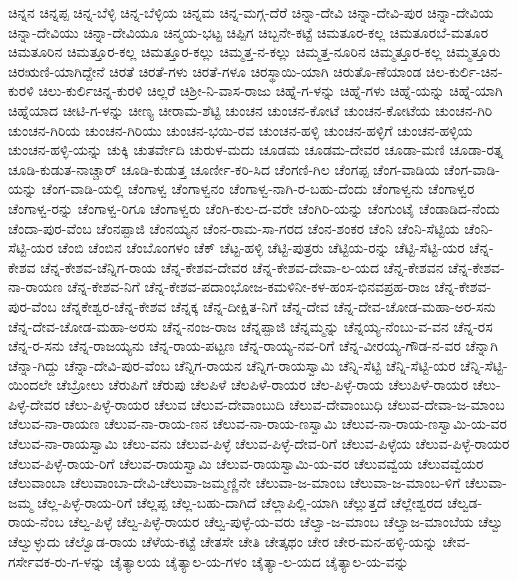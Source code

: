 ಚಿನ್ನನ
ಚಿನ್ನಪ್ಪ
ಚಿನ್ನ-ಬೆಳ್ಳಿ
ಚಿನ್ನ-ಬೆಳ್ಳಿಯ
ಚಿನ್ನಮ
ಚಿನ್ನ-ಮಗ್ಗ-ದೆರೆ
ಚಿನ್ನಾ-ದೇವಿ
ಚಿನ್ನಾ-ದೇವಿ-ಪುರ
ಚಿನ್ನಾ-ದೇವಿಯ
ಚಿನ್ನಾ-ದೇವಿಯು
ಚಿನ್ನಾ-ದೇವಿಯೂ
ಚಿನ್ಮಯ-ಭಟ್ಟ
ಚಿಪ್ಪಿಗ
ಚಿಬ್ಬನೇ-ಕಟ್ಟೆ
ಚಿಮತೂರ-ಕಲ್ಲ
ಚಿಮತೂರಬೆ-ಮತೂರ
ಚಿಮತೂರಿನ
ಚಿಮತ್ತೂರ-ಕಲ್ಲ
ಚಿಮತ್ತೂರ-ಕಲ್ಲು
ಚಿಮ್ಮತ್ತ-ನ-ಕಲ್ಲು
ಚಿಮ್ಮತ್ತ-ನೂರಿನ
ಚಿಮ್ಮತ್ತೂರ-ಕಲ್ಲ
ಚಿಮ್ಮತ್ತೂರು
ಚಿರಋಣಿ-ಯಾಗಿದ್ದೇನೆ
ಚಿರತೆ
ಚಿರತೆ-ಗಳು
ಚಿರತೆ-ಗಳೂ
ಚಿರಸ್ಥಾಯಿ-ಯಾಗಿ
ಚಿರುತೊ-ಣೆಯಾಂಡ
ಚಿಲ-ಕುರ್ಲಿ-ಚಿನ-ಕುರಳಿ
ಚಿಲು-ಕುರ್ಲಿಚಿನ್ನ-ಕುರಳಿ
ಚಿಲ್ಲರೆ
ಚಿಶ್ರೀ-ನಿ-ವಾಸ-ರಾಜು
ಚಿಹ್ನೆ-ಗ-ಳನ್ನು
ಚಿಹ್ನೆ-ಗಳು
ಚಿಹ್ನೆ-ಯನ್ನು
ಚಿಹ್ನೆ-ಯಾಗಿ
ಚಿಹ್ನೆಯಾದ
ಚೀಟಿ-ಗ-ಳನ್ನು
ಚೀಣ್ಯ
ಚೀರಾಮ-ಶೆಟ್ಟಿ
ಚುಂಚನ
ಚುಂಚನ-ಕೋಟೆ
ಚುಂಚನ-ಕೋಟೆಯ
ಚುಂಚನ-ಗಿರಿ
ಚುಂಚನ-ಗಿರಿಯ
ಚುಂಚನ-ಗಿರಿಯು
ಚುಂಚನ-ಭಯಿ-ರವ
ಚುಂಚನ-ಹಳ್ಳಿ
ಚುಂಚನ-ಹಳ್ಳಿಗೆ
ಚುಂಚನ-ಹಳ್ಳಿಯ
ಚುಂಚನ-ಹಳ್ಳಿ-ಯನ್ನು
ಚುಕ್ಕಿ
ಚುತರ್ವೇದಿ
ಚುರುಳ-ಮದು
ಚೂಡಮ
ಚೂಡಮ-ದೇವರ
ಚೂಡಾ-ಮಣಿ
ಚೂಡಾ-ರತ್ನ
ಚೂಡಿ-ಕುಡುತ-ನಾಚ್ಚಾರ್
ಚೂಡಿ-ಕುಡುತ್ತ
ಚೂರ್ಣೀ-ಕರಿ-ಸಿದ
ಚೆಂಗಣಿ-ಗಿಲ
ಚೆಂಗಪ್ಪ
ಚೆಂಗ-ವಾಡಿಯ
ಚೆಂಗ-ವಾಡಿ-ಯನ್ನು
ಚೆಂಗ-ವಾಡಿ-ಯಲ್ಲಿ
ಚೆಂಗಾಳ್ವ
ಚೆಂಗಾಳ್ವನಂ
ಚೆಂಗಾಳ್ವ-ನಾಗಿ-ರ-ಬಹು-ದೆಂದು
ಚೆಂಗಾಳ್ವನು
ಚೆಂಗಾಳ್ವರ
ಚೆಂಗಾಳ್ವ-ರನ್ನು
ಚೆಂಗಾಳ್ವ-ರಿಗೂ
ಚೆಂಗಾಳ್ವರು
ಚೆಂಗಿ-ಕುಲ-ದ-ವರೇ
ಚೆಂಗಿರಿ-ಯನ್ನು
ಚೆಂಗುಂಟೈ
ಚೆಂಡಾಡಿದ-ನೆಂದು
ಚೆಂದಾ-ಪುರ-ವೆಂಬ
ಚೆಂನಪ್ಪಾಜಿ
ಚೆಂನಯ್ಯನ
ಚೆಂನ-ರಾಮ-ಸಾ-ಗರದ
ಚೆಂನ-ಶಂಕರ
ಚೆಂನಿ
ಚೆಂನಿ-ಸೆಟ್ಟಿಯ
ಚೆಂನಿ-ಸೆಟ್ಟಿ-ಯರ
ಚೆಂಬಿ
ಚೆಂಬಿನ
ಚೆಂಬೊಂಗಳಂ
ಚೆಕ್
ಚೆಟ್ಟ-ಹಳ್ಳಿ
ಚೆಟ್ಟಿ-ಪುತ್ರರು
ಚೆಟ್ಟಿಯ-ರನ್ನು
ಚೆಟ್ಟಿ-ಸೆಟ್ಟಿ-ಯರ
ಚೆನ್ನ-ಕೇಶವ
ಚೆನ್ನ-ಕೇಶವ-ಚೆನ್ನಿಗ-ರಾಯ
ಚೆನ್ನ-ಕೇಶವ-ದೇವರ
ಚೆನ್ನ-ಕೇಶವ-ದೇವಾ-ಲ-ಯದ
ಚೆನ್ನ-ಕೇಶವನ
ಚೆನ್ನ-ಕೇಶವ-ನಾ-ರಾಯಣ
ಚೆನ್ನ-ಕೇಶವ-ನಿಗೆ
ಚೆನ್ನ-ಕೇಶವ-ಪದಾಂಭೋಜ-ಕಮಳಿನೀ-ಕಳ-ಹಂಸ-ಭಿನವಪ್ರಹ-ರಾಜ
ಚೆನ್ನ-ಕೇಶವ-ಪುರ-ವೆಂಬ
ಚೆನ್ನಕೇಶ್ವರ-ಚೆನ್ನ-ಕೇಶವ
ಚೆನ್ನಕ್ಕ
ಚೆನ್ನ-ದೀಕ್ಷಿತ-ನಿಗೆ
ಚೆನ್ನ-ದೇವ
ಚೆನ್ನ-ದೇವ-ಚೋಡ-ಮಹಾ-ಅರ-ಸನು
ಚೆನ್ನ-ದೇವ-ಚೋಡ-ಮಹಾ-ಅರಸು
ಚೆನ್ನ-ನಂಜ-ರಾಜ
ಚೆನ್ನಪ್ಪಾಜಿ
ಚೆನ್ನಮ್ಮನ್ನು
ಚೆನ್ನಯ್ಯ-ನೆಂಬು-ವ-ವನ
ಚೆನ್ನ-ರಸ
ಚೆನ್ನ-ರ-ಸನು
ಚೆನ್ನ-ರಾಜಯ್ಯನು
ಚೆನ್ನ-ರಾಯ-ಪಟ್ಟಣ
ಚೆನ್ನ-ರಾಯ್ಯ-ನವ-ರಿಗೆ
ಚೆನ್ನ-ವೀರಯ್ಯ-ಗೌಡ-ನ-ವರ
ಚೆನ್ನಾಗಿ
ಚೆನ್ನಾ-ಗಿದ್ದು
ಚೆನ್ನಾ-ದೇವಿ-ಪುರ-ವೆಂಬ
ಚೆನ್ನಿಗ-ರಾಯನ
ಚೆನ್ನಿಗ-ರಾಯಸ್ವಾಮಿ
ಚೆನ್ನಿ-ಸೆಟ್ಟಿ
ಚೆನ್ನಿ-ಸೆಟ್ಟಿ-ಯರ
ಚೆನ್ನಿ-ಸೆಟ್ಟಿ-ಯಿಂದಲೇ
ಚೆಬ್ರೋಲು
ಚೆರುಪಿಗೆ
ಚೆರುಪು
ಚೆಲಪಿಳೆ
ಚೆಲಪಿಳೆ-ರಾಯರ
ಚೆಲ-ಪಿಳ್ಳೆ-ರಾಯ
ಚೆಲುಪಿಳೆ-ರಾಯರ
ಚೆಲು-ಪಿಳ್ಳೆ-ದೇವರ
ಚೆಲು-ಪಿಳ್ಳೆ-ರಾಯರ
ಚೆಲುವ
ಚೆಲುವ-ದೇವಾಂಬುದಿ
ಚೆಲುವ-ದೇವಾಂಬುಧಿ
ಚೆಲುವ-ದೇವಾ-ಜ-ಮಾಂಬ
ಚೆಲುವ-ನಾ-ರಾಯಣ
ಚೆಲುವ-ನಾ-ರಾಯ-ಣನ
ಚೆಲುವ-ನಾ-ರಾಯ-ಣಸ್ವಾಮಿ
ಚೆಲುವ-ನಾ-ರಾಯ-ಣಸ್ವಾಮಿ-ಯ-ವರ
ಚೆಲುವ-ನಾ-ರಾಯಸ್ವಾಮಿ
ಚೆಲು-ವನು
ಚೆಲುವ-ಪಿಳ್ಳೆ
ಚೆಲುವ-ಪಿಳ್ಳೆ-ದೇವ-ರಿಗೆ
ಚೆಲುವ-ಪಿಳ್ಳೆಯ
ಚೆಲುವ-ಪಿಳ್ಳೆ-ರಾಯರ
ಚೆಲುವ-ಪಿಳ್ಳೆ-ರಾಯ-ರಿಗೆ
ಚೆಲುವ-ರಾಯಸ್ವಾಮಿ
ಚೆಲುವ-ರಾಯಸ್ವಾಮಿ-ಯ-ವರ
ಚೆಲುವವ್ವೆಯ
ಚೆಲುವವ್ವೆಯರ
ಚೆಲುವಾಂಬಾ
ಚೆಲುವಾಂಬಾ-ದೇವಿ-ಚೆಲುವಾ-ಜಮ್ಮಣ್ಣಿನೇ
ಚೆಲುವಾ-ಜ-ಮಾಂಬ
ಚೆಲುವಾ-ಜ-ಮಾಂಬ-ಳಿಗೆ
ಚೆಲುವಾ-ಜಮ್ಮ
ಚೆಲ್ಲ-ಪಿಳ್ಳೆ-ರಾಯ-ರಿಗೆ
ಚೆಲ್ಲಪ್ಪ
ಚೆಲ್ಲ-ಬಹು-ದಾಗಿದೆ
ಚೆಲ್ಲಾಪಿಲ್ಲಿ-ಯಾಗಿ
ಚೆಲ್ಲುತ್ತದೆ
ಚೆಲ್ಲೇಶ್ವರದ
ಚೆಲ್ವಡ-ರಾಯ-ನೆಂಬ
ಚೆಲ್ವ-ಪಿಳ್ಳೆ
ಚೆಲ್ವ-ಪಿಳ್ಳೆ-ರಾಯರ
ಚೆಲ್ವ-ಪುಳ್ಳೆ-ಯ-ವರು
ಚೆಲ್ವಾ-ಜ-ಮಾಂಬ
ಚೆಲ್ವಾಜ-ಮಾಂಬೆಯ
ಚೆಲ್ವು
ಚೆಲ್ವುಳ್ಳುದು
ಚೆಲ್ವೊಡ-ರಾಯ
ಚೆಳೆಯ-ಕಟ್ಟೆ
ಚೇತಸೇ
ಚೇತಿ
ಚೇತ್ಕಥಂ
ಚೇರ
ಚೇರ-ಮನ-ಹಳ್ಳಿ-ಯನ್ನು
ಚೇವ-ಗರ್ಸೇವಕ-ರು-ಗ-ಳನ್ನು
ಚೈತ್ಯಾಲಯ
ಚೈತ್ಯಾಲ-ಯ-ಗಳಂ
ಚೈತ್ಯಾ-ಲ-ಯದ
ಚೈತ್ಯಾಲ-ಯ-ವನ್ನು
